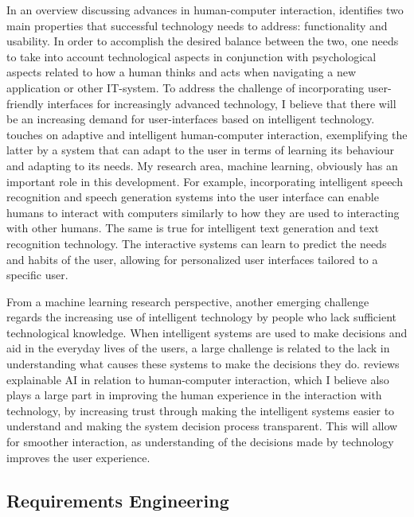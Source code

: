 \documentclass{article}
\begin{document}
In an overview discussing advances in human-computer interaction, \citet{hci_overview} identifies two main properties that successful technology needs to address: functionality and usability. In order to accomplish the desired balance between the two, one needs to take into account technological aspects in conjunction with psychological aspects related to how a human thinks and acts when navigating a new application or other IT-system. To address the challenge of incorporating user-friendly interfaces for increasingly advanced technology, I believe that there will be an increasing demand for user-interfaces based on intelligent technology. \citet{hci_overview} touches on adaptive and intelligent human-computer interaction, exemplifying the latter by a system that can adapt to the user in terms of learning its behaviour and adapting to its needs. My research area, machine learning, obviously has an important role in this development. For example, incorporating intelligent speech recognition and speech generation systems into the user interface can enable humans to interact with computers similarly to how they are used to interacting with other humans. The same is true for intelligent text generation and text recognition technology. The interactive systems can learn to predict the needs and habits of the user, allowing for personalized user interfaces tailored to a specific user. 

From a machine learning research perspective, another emerging challenge regards the increasing use of intelligent technology by people who lack sufficient technological knowledge. When intelligent systems are used to make decisions and aid in the everyday lives of the users, a large challenge is related to the lack in understanding what causes these systems to make the decisions they do. \citet{xai} reviews explainable AI in relation to human-computer interaction, which I believe also plays a large part in improving the human experience in the interaction with technology, by increasing trust through making the intelligent systems easier to understand and making the system decision process transparent. This will allow for smoother interaction, as understanding of the decisions made by technology improves the user experience.   

\subsection{Requirements Engineering}
\end{document}
